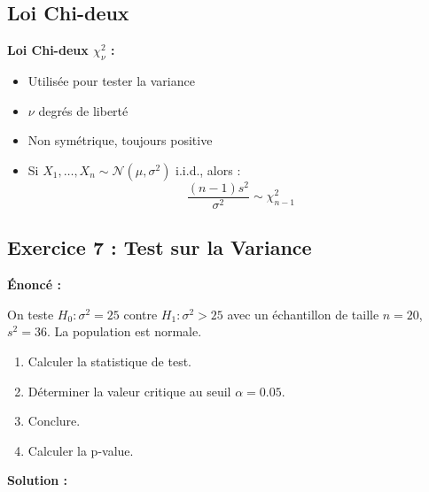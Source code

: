 \documentclass[11pt,a4paper]{article}
\begin{document}
\subsection{Loi Chi-deux}

\begin{rappelbox}
\textbf{Loi Chi-deux $\chi^2_\nu$ :}
\begin{itemize}
    \item Utilisée pour tester la variance
    \item $\nu$ degrés de liberté
    \item Non symétrique, toujours positive
    \item Si $X_1, \ldots, X_n \sim \mathcal{N}(\mu, \sigma^2)$ i.i.d., alors :
    $$\frac{(n-1)s^2}{\sigma^2} \sim \chi^2_{n-1}$$
\end{itemize}
\end{rappelbox}

\subsection{Exercice 7 : Test sur la Variance}

\textbf{Énoncé :}

On teste $H_0 : \sigma^2 = 25$ contre $H_1 : \sigma^2 > 25$ avec un échantillon de taille $n = 20$, $s^2 = 36$. La population est normale.

\begin{enumerate}
    \item Calculer la statistique de test.
    \item Déterminer la valeur critique au seuil $\alpha = 0.05$.
    \item Conclure.
    \item Calculer la p-value.
\end{enumerate}

\textbf{Solution :}
\end{document}
